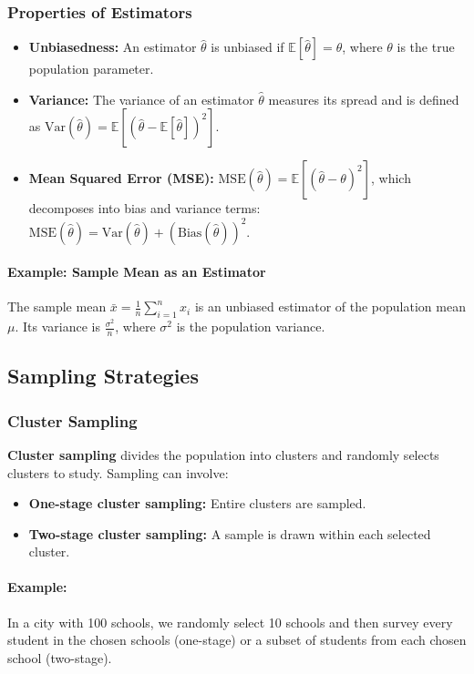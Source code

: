 \documentclass[12pt,a4paper]{article}
\begin{document}
\subsubsection*{Properties of Estimators}
\begin{itemize}
    \item \textbf{Unbiasedness:} An estimator $\hat{\theta}$ is unbiased if $\mathbb{E}[\hat{\theta}] = \theta$, where $\theta$ is the true population parameter.
    \item \textbf{Variance:} The variance of an estimator $\hat{\theta}$ measures its spread and is defined as $\text{Var}(\hat{\theta}) = \mathbb{E}[(\hat{\theta} - \mathbb{E}[\hat{\theta}])^2]$.
    \item \textbf{Mean Squared Error (MSE):} $\text{MSE}(\hat{\theta}) = \mathbb{E}[(\hat{\theta} - \theta)^2]$, which decomposes into bias and variance terms: $\text{MSE}(\hat{\theta}) = \text{Var}(\hat{\theta}) + (\text{Bias}(\hat{\theta}))^2$.
\end{itemize}

\paragraph{Example: Sample Mean as an Estimator}
The sample mean $\bar{x} = \frac{1}{n} \sum_{i=1}^n x_i$ is an unbiased estimator of the population mean $\mu$. Its variance is $\frac{\sigma^2}{n}$, where $\sigma^2$ is the population variance.

\subsection{Sampling Strategies}
\subsubsection*{Cluster Sampling}
\textbf{Cluster sampling} divides the population into clusters and randomly selects clusters to study. Sampling can involve:
\begin{itemize}
    \item \textbf{One-stage cluster sampling:} Entire clusters are sampled.
    \item \textbf{Two-stage cluster sampling:} A sample is drawn within each selected cluster.
\end{itemize}

\paragraph{Example:}
In a city with 100 schools, we randomly select 10 schools and then survey every student in the chosen schools (one-stage) or a subset of students from each chosen school (two-stage).
\end{document}
